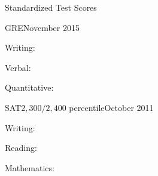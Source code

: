 \documentclass{resume}
\newcommand{\IB}[0]{\DepartmentTitle{IB Coursework}{}}
\newcommand{\Southridge}[0]{\UniversityTitle{Southridge High School}{}}
\begin{document}
  \begin{rSection}{Standardized Test Scores}

  \begin{rSubSection}{GRE}{November 2015}{}{}
  \item Writing:~\tab\tab{}\tab{}
  \item Verbal:~\tab\tab{}\tab{}
  \item Quantitative:~\tab{}\tab{}
  \end{rSubSection}

  \begin{rSubSection}{SAT\hspace{8.9em}$2,300/2,400$\hspace{4.3em}\normalfont{} percentile}{October 2011}{}{}
  \item Writing:~\tab\tab{}\tab{}
  \item Reading:~\tab\tab{}\tab{}
  \item Mathematics:~\tab{}\tab{}
  \end{rSubSection}





\end{rSection}
\end{document}
